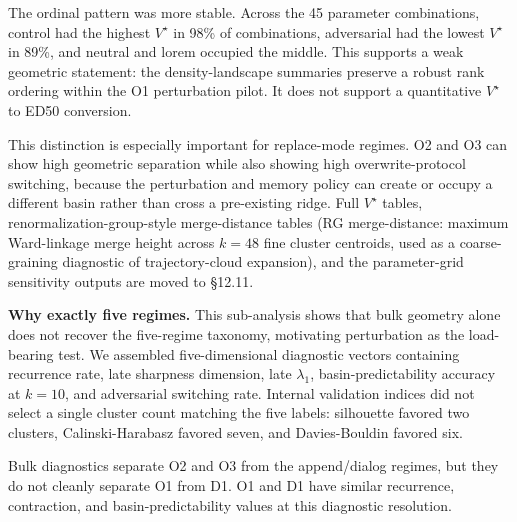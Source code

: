\documentclass{article}
\theoremstyle{plain}
\theoremstyle{definition}
\begin{document}
The ordinal pattern was more stable. Across the 45 parameter combinations, control had the highest $V^\star$ in 98\% of combinations, adversarial had the lowest $V^\star$ in 89\%, and neutral and lorem occupied the middle. This supports a weak geometric statement: the density-landscape summaries preserve a robust rank ordering within the O1 perturbation pilot. It does not support a quantitative $V^\star$ to ED50 conversion.

This distinction is especially important for replace-mode regimes. O2 and O3 can show high geometric separation while also showing high overwrite-protocol switching, because the perturbation and memory policy can create or occupy a different basin rather than cross a pre-existing ridge. Full $V^\star$ tables, renormalization-group-style merge-distance tables (RG merge-distance: maximum Ward-linkage merge height across $k=48$ fine cluster centroids, used as a coarse-graining diagnostic of trajectory-cloud expansion), and the parameter-grid sensitivity outputs are moved to §12.11.

\textbf{Why exactly five regimes.} This sub-analysis shows that bulk geometry alone does not recover the five-regime taxonomy, motivating perturbation as the load-bearing test. We assembled five-dimensional diagnostic vectors containing recurrence rate, late sharpness dimension, late $\lambda_1$, basin-predictability accuracy at $k=10$, and adversarial switching rate. Internal validation indices did not select a single cluster count matching the five labels: silhouette favored two clusters, Calinski-Harabasz favored seven, and Davies-Bouldin favored six.

Bulk diagnostics separate O2 and O3 from the append/dialog regimes, but they do not cleanly separate O1 from D1. O1 and D1 have similar recurrence, contraction, and basin-predictability values at this diagnostic resolution.
\end{document}
